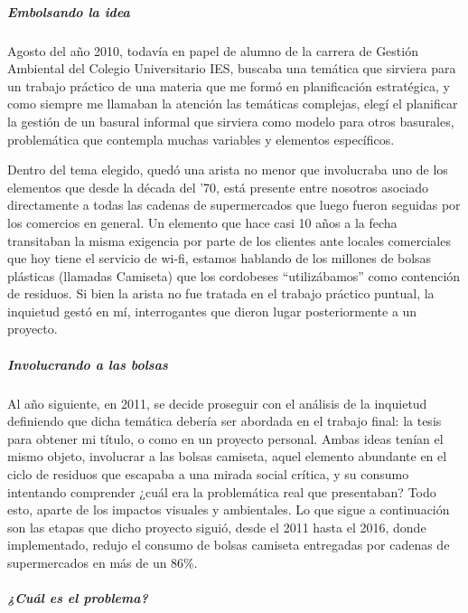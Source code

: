 \documentclass[
]{article}
\begin{document}
\hypertarget{embolsando-la-idea}{%
\subparagraph{Embolsando la idea}\label{embolsando-la-idea}}

Agosto del año 2010, todavía en papel de alumno de la carrera de Gestión
Ambiental del Colegio Universitario IES, buscaba una temática que
sirviera para un trabajo práctico de una materia que me formó en
planificación estratégica, y como siempre me llamaban la atención las
temáticas complejas, elegí el planificar la gestión de un basural
informal que sirviera como modelo para otros basurales, problemática que
contempla muchas variables y elementos específicos.

Dentro del tema elegido, quedó una arista no menor que involucraba uno
de los elementos que desde la década del '70, está presente entre
nosotros asociado directamente a todas las cadenas de supermercados que
luego fueron seguidas por los comercios en general. Un elemento que hace
casi 10 años a la fecha transitaban la misma exigencia por parte de los
clientes ante locales comerciales que hoy tiene el servicio de wi-fi,
estamos hablando de los millones de bolsas plásticas (llamadas Camiseta)
que los cordobeses ``utilizábamos'' como contención de residuos. Si bien
la arista no fue tratada en el trabajo práctico puntual, la inquietud
gestó en mí, interrogantes que dieron lugar posteriormente a un
proyecto.

\hypertarget{involucrando-a-las-bolsas}{%
\subparagraph{\texorpdfstring{\textbf{Involucrando a las
bolsas}}{Involucrando a las bolsas}}\label{involucrando-a-las-bolsas}}

Al año siguiente, en 2011, se decide proseguir con el análisis de la
inquietud definiendo que dicha temática debería ser abordada en el
trabajo final: la tesis para obtener mi título, o como en un proyecto
personal. Ambas ideas tenían el mismo objeto, involucrar a las bolsas
camiseta, aquel elemento abundante en el ciclo de residuos que escapaba
a una mirada social crítica, y su consumo intentando comprender ¿cuál
era la problemática real que presentaban? Todo esto, aparte de los
impactos visuales y ambientales. Lo que sigue a continuación son las
etapas que dicho proyecto siguió, desde el 2011 hasta el 2016, donde
implementado, redujo el consumo de bolsas camiseta entregadas por
cadenas de supermercados en más de un 86\%.

\hypertarget{cuuxe1l-es-el-problema}{%
\subparagraph{\texorpdfstring{\textbf{¿Cuál es el
problema?}}{¿Cuál es el problema?}}\label{cuuxe1l-es-el-problema}}
\end{document}
